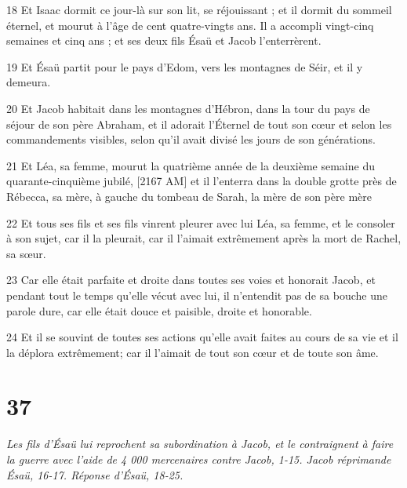 \par 18 Et Isaac dormit ce jour-là sur son lit, se réjouissant ; et il dormit du sommeil éternel, et mourut à l'âge de cent quatre-vingts ans. Il a accompli vingt-cinq semaines et cinq ans ; et ses deux fils Ésaü et Jacob l'enterrèrent.
\par 19 Et Ésaü partit pour le pays d'Edom, vers les montagnes de Séir, et il y demeura.
\par 20 Et Jacob habitait dans les montagnes d'Hébron, dans la tour du pays de séjour de son père Abraham, et il adorait l'Éternel de tout son cœur et selon les commandements visibles, selon qu'il avait divisé les jours de son générations.
\par 21 Et Léa, sa femme, mourut la quatrième année de la deuxième semaine du quarante-cinquième jubilé, [2167 AM] et il l'enterra dans la double grotte près de Rébecca, sa mère, à gauche du tombeau de Sarah, la mère de son père mère
\par 22 Et tous ses fils et ses fils vinrent pleurer avec lui Léa, sa femme, et le consoler à son sujet, car il la pleurait, car il l'aimait extrêmement après la mort de Rachel, sa sœur.
\par 23 Car elle était parfaite et droite dans toutes ses voies et honorait Jacob, et pendant tout le temps qu'elle vécut avec lui, il n'entendit pas de sa bouche une parole dure, car elle était douce et paisible, droite et honorable.
\par 24 Et il se souvint de toutes ses actions qu'elle avait faites au cours de sa vie et il la déplora extrêmement; car il l'aimait de tout son cœur et de toute son âme.

\chapter{37}

\par \textit{Les fils d'Ésaü lui reprochent sa subordination à Jacob, et le contraignent à faire la guerre avec l'aide de 4 000 mercenaires contre Jacob, 1-15. Jacob réprimande Ésaü, 16-17. Réponse d'Ésaü, 18-25.}

